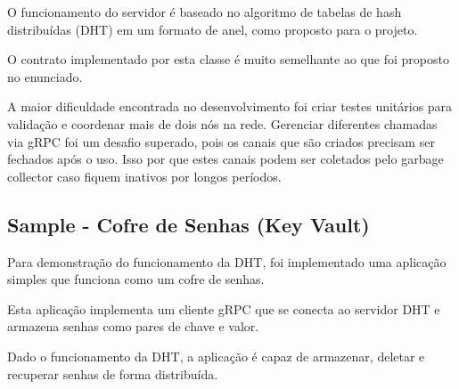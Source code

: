 \documentclass{article}
\begin{document}
    O funcionamento do servidor é baseado no algoritmo de tabelas de hash distribuídas (DHT) em um formato de anel, como proposto para o projeto.

    O contrato implementado por esta classe é muito semelhante ao que foi proposto no enunciado.

    A maior dificuldade encontrada no desenvolvimento foi criar testes unitários para validação e coordenar mais de dois nós na rede.
    Gerenciar diferentes chamadas via gRPC foi um desafio superado, pois os canais que são criados precisam ser fechados após o uso.
    Isso por que estes canais podem ser coletados pelo garbage collector caso fiquem inativos por longos períodos.

    \subsection{Sample - Cofre de Senhas (Key Vault)}\label{subsec:cliente}

    Para demonstração do funcionamento da DHT, foi implementado uma aplicação simples que funciona como um cofre de senhas.

    Esta aplicação implementa um cliente gRPC que se conecta ao servidor DHT e armazena senhas como pares de chave e valor.

    Dado o funcionamento da DHT, a aplicação é capaz de armazenar, deletar e recuperar senhas de forma distribuída.
\end{document}
